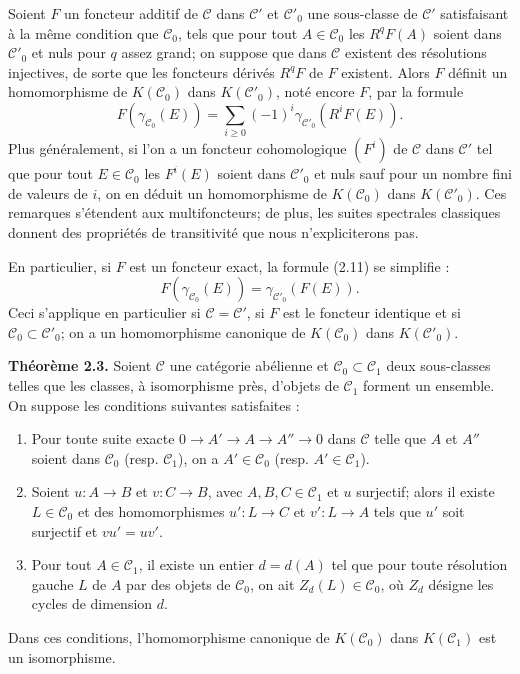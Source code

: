 \documentclass[11pt]{article}
\providecommand{\cC}{\mathcal C}
\begin{document}
Soient $F$ un foncteur additif de $\cC$ dans $\cC'$ et $\cC'_0$ une sous-classe de $\cC'$ satisfaisant à la même condition que $\cC_0$, tels que pour tout $A\in\cC_0$ les $R^qF(A)$ soient dans $\cC'_0$ et nuls pour $q$ assez grand; on suppose que dans $\cC$ existent des résolutions injectives, de sorte que les foncteurs dérivés $R^qF$ de $F$ existent. Alors $F$ définit un homomorphisme de $K(\cC_0)$ dans $K(\cC'_0)$, noté encore $F$, par la formule
\begin{equation}\tag{2.11}
 F(\gamma_{\cC_0}(E))=\sum_{i\geq 0}(-1)^i\gamma_{\cC'_0}(R^iF(E)).
\end{equation}
Plus généralement, si l'on a un foncteur cohomologique $(F^i)$ de $\cC$ dans $\cC'$ tel que pour tout $E\in\cC_0$ les $F^i(E)$ soient dans $\cC'_0$ et nuls sauf pour un nombre fini de valeurs de $i$, on en déduit un homomorphisme de $K(\cC_0)$ dans $K(\cC'_0)$. Ces remarques s'étendent aux multifoncteurs; de plus, les suites spectrales classiques donnent des propriétés de transitivité que nous n'expliciterons pas.

En particulier, si $F$ est un foncteur exact, la formule (2.11) se simplifie :
\begin{equation}\tag{2.11 bis}
 F(\gamma_{\cC_0}(E))=\gamma_{\cC'_0}(F(E)).
\end{equation}
Ceci s'applique en particulier si $\cC=\cC'$, si $F$ est le foncteur identique et si $\cC_0\subset\cC'_0$; on a un homomorphisme canonique de $K(\cC_0)$ dans $K(\cC'_0)$.

\textbf{Théorème 2.3.} Soient $\cC$ une catégorie abélienne et $\cC_0\subset\cC_1$ deux sous-classes telles que les classes, à isomorphisme près, d'objets de $\cC_1$ forment un ensemble. On suppose les conditions suivantes satisfaites :
\begin{enumerate}[label=(\roman*)]
\item Pour toute suite exacte $0\to A'\to A\to A''\to0$ dans $\cC$ telle que $A$ et $A''$ soient dans $\cC_0$ (resp. $\cC_1$), on a $A'\in\cC_0$ (resp. $A'\in\cC_1$).
\item Soient $u:A\to B$ et $v:C\to B$, avec $A,B,C\in\cC_1$ et $u$ surjectif; alors il existe $L\in\cC_0$ et des homomorphismes $u':L\to C$ et $v':L\to A$ tels que $u'$ soit surjectif et $vu'=uv'$.
\item Pour tout $A\in\cC_1$, il existe un entier $d=d(A)$ tel que pour toute résolution gauche $L$ de $A$ par des objets de $\cC_0$, on ait $Z_d(L)\in\cC_0$, où $Z_d$ désigne les cycles de dimension $d$.
\end{enumerate}
Dans ces conditions, l'homomorphisme canonique de $K(\cC_0)$ dans $K(\cC_1)$ est un isomorphisme.
\end{document}
